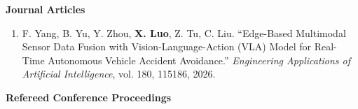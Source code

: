 \documentclass[letterpaper,11pt]{article}
\begin{document}
\normalsize{\textbf{Journal Articles}}
\vspace{10pt}
\small
\begin{justifying}
\begin{enumerate}

\item F. Yang, B. Yu, Y. Zhou, \textbf{X. Luo}, Z. Tu, C. Liu. “Edge-Based Multimodal Sensor Data Fusion with Vision-Language-Action (VLA) Model for Real-Time Autonomous Vehicle Accident Avoidance.” \textit{Engineering Applications of Artificial Intelligence}, vol. 180, 115186, 2026.

\end{enumerate}
\end{justifying}

\vspace{6pt}
\normalsize{\textbf{Refereed Conference Proceedings}}
\vspace{10pt}
\small
\end{document}

